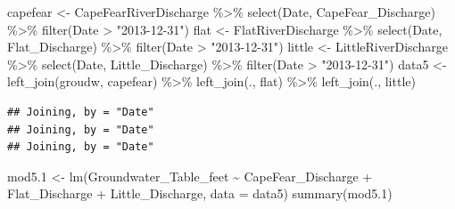\documentclass[
  12pt,
]{article}
\newenvironment{Shaded}{\begin{snugshade}}{\end{snugshade}}
\newcommand{\AttributeTok}[1]{\textcolor[rgb]{0.77,0.63,0.00}{#1}}
\newcommand{\FloatTok}[1]{\textcolor[rgb]{0.00,0.00,0.81}{#1}}
\newcommand{\FunctionTok}[1]{\textcolor[rgb]{0.00,0.00,0.00}{#1}}
\newcommand{\NormalTok}[1]{#1}
\newcommand{\OtherTok}[1]{\textcolor[rgb]{0.56,0.35,0.01}{#1}}
\newcommand{\SpecialCharTok}[1]{\textcolor[rgb]{0.00,0.00,0.00}{#1}}
\newcommand{\StringTok}[1]{\textcolor[rgb]{0.31,0.60,0.02}{#1}}
\begin{document}
\begin{Shaded}
\begin{Highlighting}[]
\NormalTok{capefear }\OtherTok{\textless{}{-}}\NormalTok{ CapeFearRiverDischarge }\SpecialCharTok{\%\textgreater{}\%}
  \FunctionTok{select}\NormalTok{(Date, CapeFear\_Discharge) }\SpecialCharTok{\%\textgreater{}\%}
  \FunctionTok{filter}\NormalTok{(Date }\SpecialCharTok{\textgreater{}} \StringTok{"2013{-}12{-}31"}\NormalTok{)}
\NormalTok{flat }\OtherTok{\textless{}{-}}\NormalTok{ FlatRiverDischarge }\SpecialCharTok{\%\textgreater{}\%}
  \FunctionTok{select}\NormalTok{(Date, Flat\_Discharge) }\SpecialCharTok{\%\textgreater{}\%}
  \FunctionTok{filter}\NormalTok{(Date }\SpecialCharTok{\textgreater{}} \StringTok{"2013{-}12{-}31"}\NormalTok{)}
\NormalTok{little }\OtherTok{\textless{}{-}}\NormalTok{ LittleRiverDischarge }\SpecialCharTok{\%\textgreater{}\%}
  \FunctionTok{select}\NormalTok{(Date, Little\_Discharge) }\SpecialCharTok{\%\textgreater{}\%}
  \FunctionTok{filter}\NormalTok{(Date }\SpecialCharTok{\textgreater{}} \StringTok{"2013{-}12{-}31"}\NormalTok{)}
\NormalTok{data5 }\OtherTok{\textless{}{-}} \FunctionTok{left\_join}\NormalTok{(groudw, capefear) }\SpecialCharTok{\%\textgreater{}\%}
  \FunctionTok{left\_join}\NormalTok{(., flat) }\SpecialCharTok{\%\textgreater{}\%}
  \FunctionTok{left\_join}\NormalTok{(., little) }
\end{Highlighting}
\end{Shaded}

\begin{verbatim}
## Joining, by = "Date"
## Joining, by = "Date"
## Joining, by = "Date"
\end{verbatim}

\begin{Shaded}
\begin{Highlighting}[]
\NormalTok{mod5}\FloatTok{.1} \OtherTok{\textless{}{-}} \FunctionTok{lm}\NormalTok{(Groundwater\_Table\_feet }\SpecialCharTok{\textasciitilde{}}\NormalTok{ CapeFear\_Discharge }\SpecialCharTok{+}\NormalTok{ Flat\_Discharge }\SpecialCharTok{+} 
\NormalTok{               Little\_Discharge, }\AttributeTok{data =}\NormalTok{ data5)}
\FunctionTok{summary}\NormalTok{(mod5}\FloatTok{.1}\NormalTok{)}
\end{Highlighting}
\end{Shaded}
\end{document}

